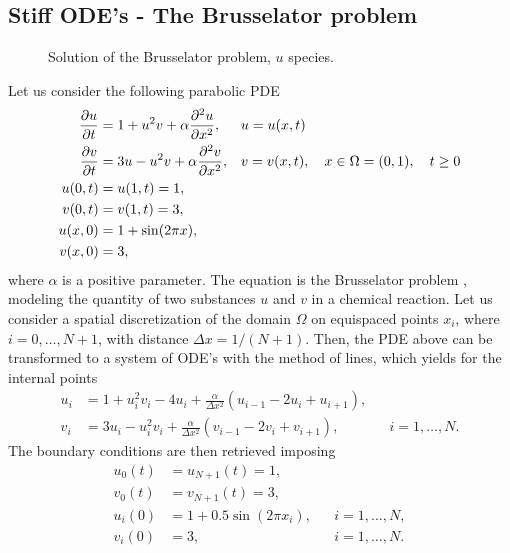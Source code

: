 \subsection{Stiff ODE's - The Brusselator problem}

\begin{figure}[t]
	\centering
	\resizebox{0.8\linewidth}{!}{}
	\caption{Solution of the Brusselator problem, $u$ species.}
	\label{fig:BrussSol}
\end{figure}

Let us consider the following parabolic PDE
\begin{equation}
\begin{aligned}
	\pdv{u}{t} &= 1 + u^2v + \alpha \pdv[2]{u}{x}, && u = u(x, t)\\
	\pdv{v}{t} &= 3u - u^2v + \alpha \pdv[2]{v}{x}, && v = v(x, t), \quad x \in \Omega = (0, 1), \quad t \geq 0 \\
	u(0, t) &= u(1, t) = 1, \\
	v(0, t) &= v(1, t) = 3, \\
	u(x, 0) &= 1 + \sin(2\pi x), \\
	v(x, 0) &= 3,
\end{aligned}
\end{equation}
where $\alpha$ is a positive parameter. The equation is the Brusselator problem \cite{HaW96}, modeling the quantity of two substances $u$ and $v$ in a chemical reaction. Let us consider a spatial discretization of the domain $\Omega$ on equispaced points $x_i$, where $i = 0, \ldots, N + 1$, with distance $\Delta x = 1 / (N + 1)$. Then, the PDE above can be transformed to a system of ODE's with the method of lines, which yields for the internal points
\begin{equation}\label{eq:BRUSS}
\begin{aligned}
u_i &= 1 + u_i^2v_i - 4u_i + \frac{\alpha}{\Delta x^2}(u_{i-1} - 2u_{i} + u_{i+1}), \\
v_i &= 3u_i - u_i^2v_i + \frac{\alpha}{\Delta x^2}(v_{i-1}-2v_i + v_{i+1}), && i = 1, \ldots, N.
\end{aligned}
\end{equation}
The boundary conditions are then retrieved imposing
\begin{equation}
\begin{aligned}
	u_0(t) &= u_{N+1}(t) = 1,  \\
	v_0(t) &= v_{N+1}(t) = 3, \\
	u_i(0) &= 1 + 0.5\sin(2\pi x_i), && i = 1, \ldots, N, \\
	v_i(0) &= 3, && i = 1, \ldots, N.
\end{aligned}
\end{equation}
